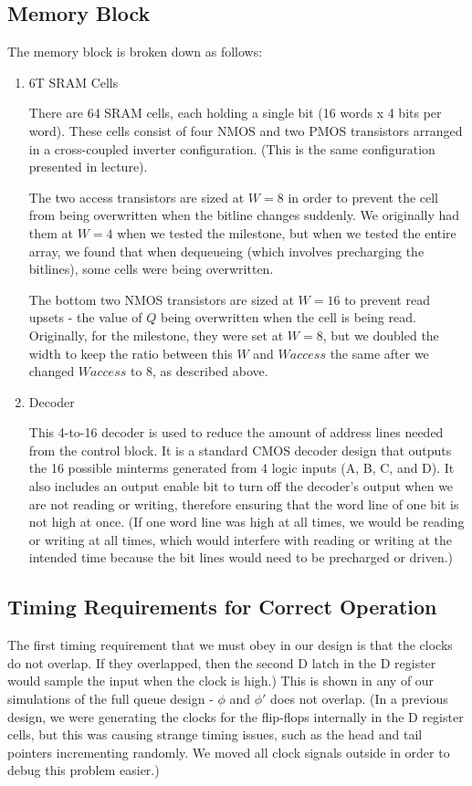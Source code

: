 \documentclass[12pt]{report}
\begin{document}
\subsection*{Memory Block}
The memory block is broken down as follows:
\begin{enumerate}
  \item 6T SRAM Cells

  There are 64 SRAM cells, each holding a single bit (16 words x 4 bits per word). These cells consist of four NMOS and two PMOS transistors arranged in a cross-coupled inverter configuration. (This is the same configuration presented in lecture).

  The two access transistors are sized at $W = 8$ in order to prevent the cell from being overwritten when the bitline changes suddenly. We originally had them at $W = 4$ when we tested the milestone, but when we tested the entire array, we found that when dequeueing (which involves precharging the bitlines), some cells were being overwritten.

  The bottom two NMOS transistors are sized at $W = 16$ to prevent read upsets - the value of $Q$ being overwritten when the cell is being read. Originally, for the milestone, they were set at $W = 8$, but we doubled the width to keep the ratio between this $W$ and $W{access}$ the same after we changed $W{access}$ to 8, as described above.

  \item Decoder

  This 4-to-16 decoder is used to reduce the amount of address lines needed from the control block. It is a standard CMOS decoder design that outputs the 16 possible minterms generated from 4 logic inputs (A, B, C, and D). It also includes an output enable bit to turn off the decoder's output when we are not reading or writing, therefore ensuring that the word line of one bit is not high at once. (If one word line was high at all times, we would be reading or writing at all times, which would interfere with reading or writing at the intended time because the bit lines would need to be precharged or driven.)
\end{enumerate}

\subsection*{Timing Requirements for Correct Operation}
The first timing requirement that we must obey in our design is that the clocks do not overlap. If they overlapped, then the second D latch in the D register would sample the input when the clock is high.) This is shown in any of our simulations of the full queue design - $\phi$ and $\phi'$ does not overlap. (In a previous design, we were generating the clocks for the flip-flops internally in the D register cells, but this was causing strange timing issues, such as the head and tail pointers incrementing randomly. We moved all clock signals outside in order to debug this problem easier.)
\end{document}
